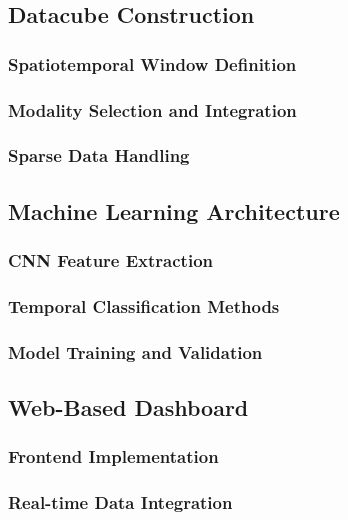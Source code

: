 \documentclass[conference]{IEEEtran}
\begin{document}
\subsection{Datacube Construction}

\subsubsection{Spatiotemporal Window Definition}

\subsubsection{Modality Selection and Integration}

\subsubsection{Sparse Data Handling}

\subsection{Machine Learning Architecture}

\subsubsection{CNN Feature Extraction}

\subsubsection{Temporal Classification Methods}

\subsubsection{Model Training and Validation}

\subsection{Web-Based Dashboard}

\subsubsection{Frontend Implementation}

\subsubsection{Real-time Data Integration}
\end{document}

